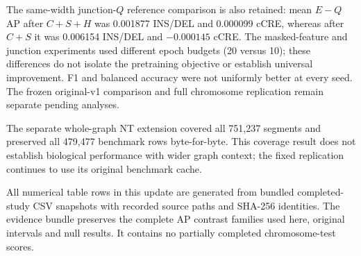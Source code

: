 The same-width junction-$Q$ reference comparison is also retained: mean $E-Q$ AP after $C+S+H$ was 0.001877 INS/DEL and 0.000099 cCRE, whereas after $C+S$ it was 0.006154 INS/DEL and $-0.000145$ cCRE. The masked-feature and junction experiments used different epoch budgets (20 versus 10); these differences do not isolate the pretraining objective or establish universal improvement. F1 and balanced accuracy were not uniformly better at every seed. The frozen original-v1 comparison and full chromosome replication remain separate pending analyses.

The separate whole-graph NT extension covered all 751,237 segments and preserved all 479,477 benchmark rows byte-for-byte. This coverage result does not establish biological performance with wider graph context; the fixed replication continues to use its original benchmark cache.

All numerical table rows in this update are generated from bundled completed-study CSV snapshots with recorded source paths and SHA-256 identities. The evidence bundle preserves the complete AP contrast families used here, original intervals and null results. It contains no partially completed chromosome-test scores.
